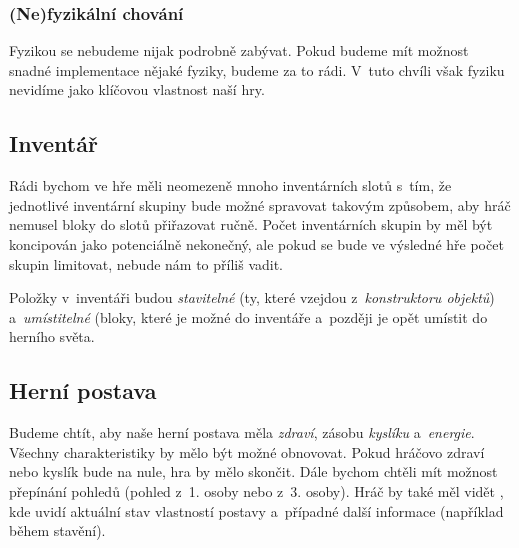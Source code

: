 \subsubsection{(Ne)fyzikální chování}

Fyzikou se nebudeme nijak podrobně zabývat. Pokud budeme mít možnost snadné implementace nějaké fyziky, budeme za to rádi. V~tuto chvíli však fyziku nevidíme jako klíčovou vlastnost naší hry. 

\subsection{Inventář}
\label{subsec:inventory}
Rádi bychom ve hře měli neomezeně mnoho inventárních slotů s~tím, že jednotlivé inventární skupiny bude možné spravovat takovým způsobem, aby hráč nemusel bloky do slotů přiřazovat ručně. Počet inventárních skupin by měl být koncipován jako potenciálně nekonečný, ale pokud se bude ve výsledné hře počet skupin limitovat, nebude nám to příliš vadit.

Položky v~inventáři budou \textit{stavitelné} (ty, které vzejdou z~\textit{konstruktoru objektů}) a~\textit{umístitelné} (bloky, které je možné  do inventáře a~později je opět umístit do herního světa.

\subsection{Herní postava}
\label{subsec:postava}
Budeme chtít, aby naše herní postava měla \textit{zdraví}, zásobu \textit{kyslíku} a~\textit{energie}. Všechny charakteristiky by mělo být možné obnovovat. Pokud hráčovo zdraví nebo kyslík bude na nule, hra by mělo skončit. Dále bychom chtěli mít možnost přepínání pohledů (pohled z~1. osoby nebo z~3. osoby). Hráč by také měl vidět \HUD{}, kde uvidí aktuální stav vlastností postavy a~případné další informace (například během stavění).



